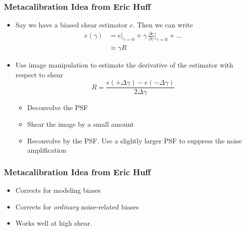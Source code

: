 \documentclass{beamer}
\newcommand{\mest}{e}
\begin{document}
\frame
{
    \frametitle{Metacalibration Idea from Eric Huff}

 
    \begin{itemize}

        \item Say we have a biased shear estimator {\color{gold} $e$}.  Then we can write
            {\color{gold}
                \begin{align} \label{eq:Eexpand}
                    \mest(\gamma) &= \mest|_{\gamma=0} + \gamma ~ \frac{ \partial \mest }{ \partial \gamma }\bigg|_{\gamma=0}  + ... \nonumber \\
                                  &\approx \gamma R \nonumber
                \end{align}
            } 
        \item Use image manipulation to estimate the derivative of the
            estimator with respect to shear
            {\color{gold}
                \begin{equation}
                    R = \frac{\mest(+\Delta\gamma) - \mest(-\Delta\gamma)}{2 \Delta \gamma} \nonumber 
                \end{equation}
            }
            \begin{itemize}
                \item Deconvolve the PSF
                \item Shear the image by a small amount
                \item Reconvolve by the PSF.  Use a slightly larger PSF to suppress
                    the noise amplification
            \end{itemize}


    \end{itemize}

}

\frame
{
    \frametitle{Metacalibration Idea from Eric Huff}

 
    \begin{itemize}
        
        \item Corrects for modeling biases

        \item Corrects for {\em ordinary} noise-related biases

        \item Works well at high shear.

    \end{itemize}

}
\end{document}
